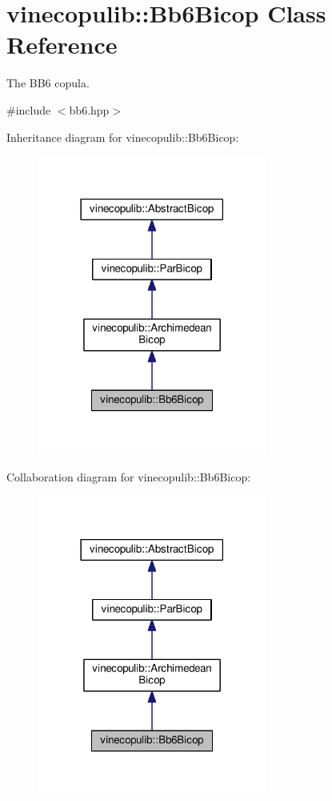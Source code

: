 \hypertarget{classvinecopulib_1_1_bb6_bicop}{}\section{vinecopulib\+:\+:Bb6\+Bicop Class Reference}
\label{classvinecopulib_1_1_bb6_bicop}


The B\+B6 copula.  




{\ttfamily \#include $<$bb6.\+hpp$>$}



Inheritance diagram for vinecopulib\+:\+:Bb6\+Bicop\+:\nopagebreak
\begin{figure}[H]
\begin{center}
\leavevmode
\includegraphics[width=213pt]{classvinecopulib_1_1_bb6_bicop__inherit__graph}
\end{center}
\end{figure}


Collaboration diagram for vinecopulib\+:\+:Bb6\+Bicop\+:\nopagebreak
\begin{figure}[H]
\begin{center}
\leavevmode
\includegraphics[width=213pt]{classvinecopulib_1_1_bb6_bicop__coll__graph}
\end{center}
\end{figure}
